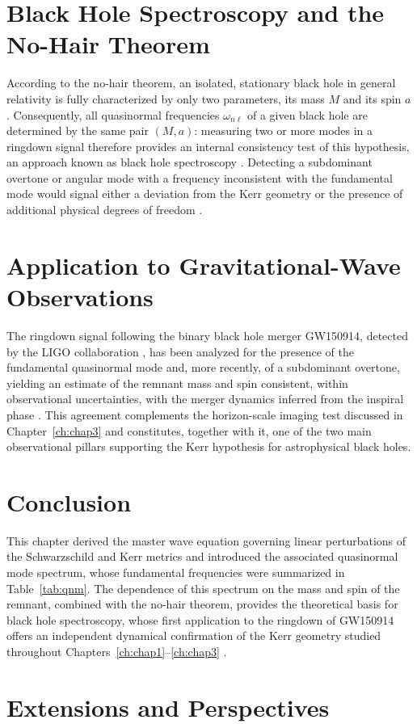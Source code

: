 \section{Black Hole Spectroscopy and the No-Hair Theorem}

According to the no-hair theorem, an isolated, stationary black hole in general relativity is fully characterized by only two parameters, its mass $M$ and its spin $a$ \cite{misner1973}. Consequently, all quasinormal frequencies $\omega_{n\ell}$ of a given black hole are determined by the same pair $(M,a)$: measuring two or more modes in a ringdown signal therefore provides an internal consistency test of this hypothesis, an approach known as black hole spectroscopy \cite{dreyer2004}. Detecting a subdominant overtone or angular mode with a frequency inconsistent with the fundamental mode would signal either a deviation from the Kerr geometry or the presence of additional physical degrees of freedom \cite{isi2019}.

\section{Application to Gravitational-Wave Observations}

The ringdown signal following the binary black hole merger GW150914, detected by the LIGO collaboration \cite{ligo2016}, has been analyzed for the presence of the fundamental quasinormal mode and, more recently, of a subdominant overtone, yielding an estimate of the remnant mass and spin consistent, within observational uncertainties, with the merger dynamics inferred from the inspiral phase \cite{isi2019}. This agreement complements the horizon-scale imaging test discussed in Chapter~\ref{ch:chap3} \cite{eht2019} and constitutes, together with it, one of the two main observational pillars supporting the Kerr hypothesis for astrophysical black holes.

\section{Conclusion}

This chapter derived the master wave equation governing linear perturbations of the Schwarzschild and Kerr metrics and introduced the associated quasinormal mode spectrum, whose fundamental frequencies were summarized in Table~\ref{tab:qnm}. The dependence of this spectrum on the mass and spin of the remnant, combined with the no-hair theorem, provides the theoretical basis for black hole spectroscopy, whose first application to the ringdown of GW150914 offers an independent dynamical confirmation of the Kerr geometry studied throughout Chapters~\ref{ch:chap1}--\ref{ch:chap3} \cite{berti2009,isi2019}.

\section{Extensions and Perspectives}
